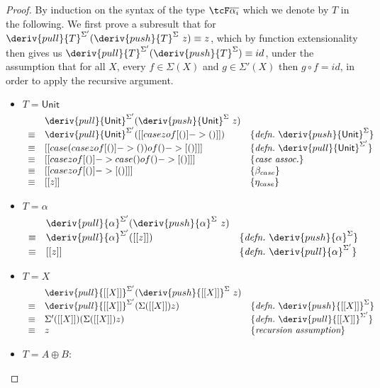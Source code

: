 \begin{proof}
By induction on the syntax of the type $\tcF \overline{\alpha_i}$ which we denote
by $T$ in the following. We first prove a subresult that for
$\deriv{pull}{T}^{\Sigma'}(\deriv{push}{T}^\Sigma \ z) \equiv z$, which by
function extensionality then gives us
$\deriv{pull}{T}^{\Sigma'}(\deriv{push}{T}^\Sigma) \equiv id$,
under the assumption that for all $X$, every $f \in \Sigma(X)$ and $g \in
\Sigma'(X)$ then $g \circ f = id$, in order to apply the recursive argument.
%
\begin{itemize}
\item $T = \mathsf{Unit}$
%
\begin{align*}
\begin{array}{rll}
       & \deriv{pull}{\mathsf{Unit}}^{\Sigma'}(\deriv{push}{\mathsf{Unit}}^\Sigma \ z) & \\
%
\equiv & \deriv{pull}{\mathsf{Unit}}^{\Sigma'}([[ case z of [ () ] -> () ]])
& \{\textit{defn.}\ \deriv{push}{\mathsf{Unit}}^\Sigma \} \\
%
\equiv & [[ case (case z of [ () ] -> () ) of () -> [ () ] ]]
& \{\textit{defn.}\ \deriv{pull}{\mathsf{Unit}}^{\Sigma'}\} \\
%
\equiv & [[ case z of [()] -> case () of () -> [ () ] ]]
& \{\textit{case assoc.}\} \\
%
\equiv & [[ case z of [()] -> [ () ] ]]
& \{\beta_{case}\} \\
%
\equiv & [[ z ]]
& \{\textit{$\eta_{case}$}\}
\end{array}
\end{align*}
%

\item $T = \alpha$
%
\begin{align*}
\begin{array}{rll}
       & \deriv{pull}{\alpha}^{\Sigma'}(\deriv{push}{\alpha}^\Sigma \ z) & \\
%
\equiv & \deriv{pull}{\alpha}^{\Sigma'}([[ z ]])
& \{\textit{defn.}\ \deriv{push}{\alpha}^\Sigma  \} \\
%
\equiv & [[ z ]] & \{\textit{defn.}\ \deriv{pull}{\alpha}^{\Sigma'} \}
\end{array}
\end{align*}

\item $T = X$
%
\begin{align*}
\begin{array}{rll}
       & \deriv{pull}{[[ X ]]}^{\Sigma'}(\deriv{push}{[[ X ]]}^\Sigma \ z) & \\
\equiv & \deriv{pull}{[[ X ]]}^{\Sigma'}(\Sigma ([[ X ]]) z) & \{ \textit{defn.}\  \deriv{push}{[[ X ]]}^\Sigma \} \\
%
\equiv & \Sigma' ([[ X ]]) (\Sigma ([[X]]) z) & \{ \textit{defn.} \  \deriv{pull}{[[ X ]]}^{\Sigma'} \} \\
\equiv & z & \{ \textit{recursion assumption} \}
\end{array}
\end{align*}
\item $T = A \oplus B$:


\end{itemize}
\end{proof}
